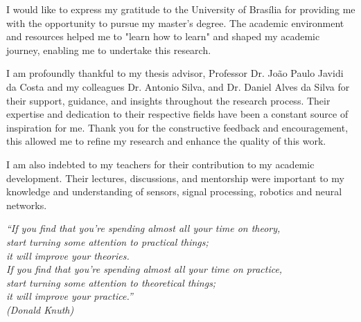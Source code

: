\documentclass[
	12pt,				%
	openright,			%
	oneside,			%
	a4paper,			%
	english,			%
	brazil				%
	]{unbtex}
\begin{document}
\begin{agradecimentos}

I would like to express my gratitude to the University of Brasília for providing me with the opportunity to pursue my master's degree. The academic environment and resources helped me to "learn how to learn" and shaped my academic journey, enabling me to undertake this research.

I am profoundly thankful to my thesis advisor, Professor Dr. João Paulo Javidi da Costa and my colleagues Dr. Antonio Silva, and Dr. Daniel Alves da Silva for their support, guidance, and insights throughout the research process. Their expertise and dedication to their respective fields have been a constant source of inspiration for me. Thank you for the constructive feedback and encouragement, this allowed me to refine my research and enhance the quality of this work.

I am also indebted to my teachers for their contribution to my academic development. Their lectures, discussions, and mentorship were important to my knowledge and understanding of sensors, signal processing, robotics and neural networks.


\end{agradecimentos}

\begin{epigrafe}
    \vspace*{\fill}
	\begin{flushright}
		\textit{``If you find that you're spending almost all your time on theory,\\ start turning some attention to practical things; \\ it will improve your theories.\\ If you find that you're spending almost all your time on practice, \\ start turning some attention to theoretical things; \\ it will improve your practice.''\\
		(Donald Knuth)}
	\end{flushright}
\end{epigrafe}
\end{document}
